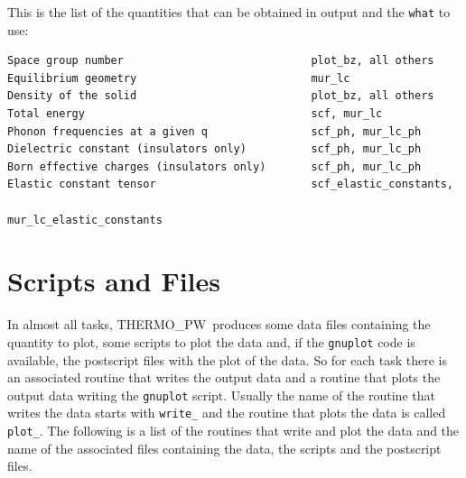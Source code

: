 \documentclass[12pt,a4paper]{article}
\def\tpw{{\sc THERMO\_PW}}
\begin{document}
\newpage
This is the list of the quantities that can be obtained in output
and the \texttt{what} to use:

\begin{verbatim}
Space group number                             plot_bz, all others
Equilibrium geometry                           mur_lc
Density of the solid                           plot_bz, all others
Total energy                                   scf, mur_lc
Phonon frequencies at a given q                scf_ph, mur_lc_ph
Dielectric constant (insulators only)          scf_ph, mur_lc_ph
Born effective charges (insulators only)       scf_ph, mur_lc_ph
Elastic constant tensor                        scf_elastic_constants, 
                                               mur_lc_elastic_constants
\end{verbatim}

\newpage
\section{\color{coral}Scripts and Files}

In almost all tasks, \tpw\ produces some data files containing the quantity 
to plot, some scripts to plot the data and, if the \texttt{gnuplot} code
is available, the postscript files with the plot of the data. So for each 
task there is an associated routine
that writes the output data and a routine that plots the output data
writing the \texttt{gnuplot} script. Usually the name of the routine that
writes the data starts with \texttt{write\_} and the routine that plots
the data is called \texttt{plot\_}. The following is a list of the routines
that write and plot the data and the name of the associated files
containing the data, the scripts and the postscript files.
\end{document}
